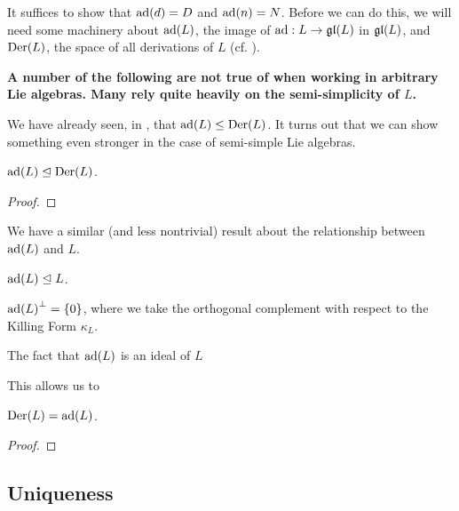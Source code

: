 It suffices to show that $\operatorname{ad}\!\left( d \right) = D$ and $\operatorname{ad}\!\left( n \right) = N$. Before we can do this, we will need some machinery about $\operatorname{ad}\!\left( L \right)$, the image of $\operatorname{ad} : L \to \mathfrak{gl}\!\left( L \right)$ in $\mathfrak{gl}\!\left( L \right)$, and $\operatorname{Der}\!\left( L \right)$, the space of all derivations of $L$ (cf. ).

\textbf{A number of the following are not true of when working in arbitrary Lie algebras. Many rely quite heavily on the semi-simplicity of $L$.}

We have already seen, in , that $\operatorname{ad}\!\left( L \right) \leq \operatorname{Der}\!\left( L \right)$. It turns out that we can show something even stronger in the case of semi-simple Lie algebras.

\begin{lemma}
    $\operatorname{ad}\!\left( L \right) \trianglelefteq \operatorname{Der}\!\left( L \right)$.
\end{lemma}
\begin{proof}
    
    \sorry
\end{proof}

We have a similar (and less nontrivial) result about the relationship between $\operatorname{ad}\!\left( L \right)$ and $L$.

\begin{lemma}
    $\operatorname{ad}\!\left( L \right) \trianglelefteq L$.
\end{lemma}

\begin{lemma}
    $\operatorname{ad}\!\left( L \right)^{\perp} = \left\{ 0 \right\}$, where we take the orthogonal complement with respect to the Killing Form $\kappa_{L}$.
\end{lemma}

The fact that $\operatorname{ad}\!\left( L \right)$ is an ideal of $L$ 

This allows us to 

\begin{boxproposition}
    $\operatorname{Der}\!\left( L \right) = \operatorname{ad}\!\left( L \right)$.
\end{boxproposition}
\begin{proof}
    
\end{proof}

\subsection{Uniqueness}


